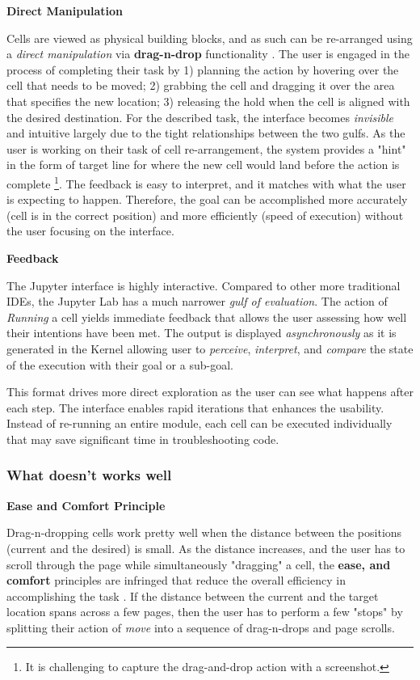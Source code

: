 \documentclass[12pt,letterpaper]{article}
\begin{document}
\textbf{Direct Manipulation}

Cells are viewed as physical building blocks, and as such can be re-arranged using a \textit{direct manipulation} via \textbf{drag-n-drop} functionality \cite{frohlich1997direct}. The user is engaged in the process of completing their task by 1) planning the action by hovering over the cell that needs to be moved; 2) grabbing the cell and dragging it over the area that specifies the new location; 3) releasing the hold when the cell is aligned with the desired destination. For the described task, the interface becomes \textit{invisible} and intuitive largely due to the tight relationships between the two gulfs. As the user is working on their task of cell re-arrangement, the system provides a "hint" in the form of target line for where the new cell would land before the action is complete \footnote{It is challenging to capture the drag-and-drop action with a screenshot.}. The feedback is easy to interpret, and it matches with what the user is expecting to happen. Therefore, the goal can be accomplished more accurately (cell is in the correct position) and more efficiently (speed of execution) without the user focusing on the interface.

\textbf{Feedback}

The Jupyter interface is highly interactive. Compared to other more traditional IDEs, the Jupyter Lab has a much narrower \textit{gulf of evaluation}. The action of \textit{Running} a cell yields immediate feedback that allows the user assessing how well their intentions have been met. The output is displayed \textit{asynchronously} as it is generated in the Kernel allowing user to \textit{perceive}, \textit{interpret}, and \textit{compare} the state of the execution with their goal or a sub-goal. 

This format drives more direct exploration as the user can see what happens after each step. The interface enables rapid iterations that enhances the usability. Instead of re-running an entire module, each cell can be executed individually that may save significant time in troubleshooting code. 

\subsubsection*{What doesn't works well}

\textbf{Ease and Comfort Principle}

Drag-n-dropping cells work pretty well when the distance between the positions (current and the desired) is small. As the distance increases, and the user has to scroll through the page while simultaneously "dragging" a cell, the \textbf{ease, and comfort} principles are infringed that reduce the overall efficiency in accomplishing the task \cite{story1998universal}. If the distance between the current and the target location spans across a few pages, then the user has to perform a few "stops" by splitting their action of \textit{move} into a sequence of drag-n-drops and page scrolls. 
\end{document}
